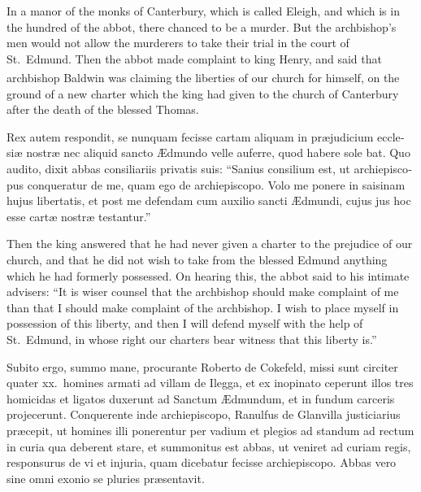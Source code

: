 \documentclass{book}
\newcounter{engnote}
\newcommand{\engnotenum}{\textsuperscript{\arabic{engnote}\stepcounter{engnote}}}
\begin{document}
\begin{paracol}{2}
\begin{otherlanguage}{latin}
\end{otherlanguage}

\switchcolumn

In a manor of the monks of Canterbury, which is called Eleigh, and which is in the hundred of the abbot, there chanced to be a murder. But the archbishop's men would not allow the murderers to take their trial in the court of St.\ Edmund. Then the abbot made complaint to king Henry, and said that archbishop Baldwin\engnotenum{} was claiming the liberties of our church for himself, on the ground of a new charter which the king had given to the church of Canterbury after the death of the blessed Thomas.

\switchcolumn*

\begin{otherlanguage}{latin}
Rex autem respondit, se nunquam fecisse cartam aliquam in pr\ae{}judicium ecclesi\ae{} nostr\ae{} nec aliquid sancto \AE{}dmundo velle auferre, quod habere sole bat. Quo audito, dixit abbas consiliariis privatis suis: ``Sanius consilium est, ut archiepiscopus conqueratur de me, quam ego de archiepiscopo. Volo me ponere in saisinam hujus libertatis, et post me defendam cum auxilio sancti \AE{}dmundi, cujus jus hoc esse cart\ae{} nostr\ae{} testantur.''
\end{otherlanguage}

\switchcolumn

Then the king answered that he had never given a charter to the prejudice of our church, and that he did not wish to take from the blessed Edmund anything which he had formerly possessed. On hearing this, the abbot said to his intimate advisers: ``It is wiser counsel that the archbishop should make complaint of me than that I should make complaint of the archbishop. I wish to place myself in possession of this liberty, and then I will defend myself with the help of St.\ Edmund, in whose right our charters bear witness that this liberty is.''

\switchcolumn*

\begin{otherlanguage}{latin}
Subito ergo, summo mane, procurante Roberto de Cokefeld, missi sunt circiter quater xx.\ homines armati ad villam de Ilegga, et ex inopinato ceperunt illos tres homicidas et ligatos duxerunt ad Sanctum \AE{}dmundum, et in fundum carceris projecerunt. Conquerente inde archiepiscopo, Ranulfus de Glanvilla justiciarius pr\ae{}cepit, ut homines illi ponerentur per vadium et plegios ad standum ad rectum in curia qua deberent stare, et summonitus est abbas, ut veniret ad curiam regis, responsurus de vi et injuria, quam dicebatur fecisse archiepiscopo. Abbas vero sine omni exonio se pluries pr\ae{}sentavit.
\end{otherlanguage}


\end{paracol}
\end{document}

